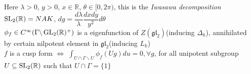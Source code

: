 \documentclass[main]{subfiles}
\begin{document}
Here $\lambda>0$, $y>0$, $x\in\mathbb R$, $\theta\in[0,2\pi)$, this is the \textit{Iwasawa decomposition} $\operatorname{SL}_2(\mathbb R)=NAK$, $dg=\dfrac{d\lambda}{\lambda}\dfrac{dxdy}{y^2}d\theta$ \\
$\phi_f\in C^\infty(\Gamma\backslash\operatorname{GL}_2(\mathbb R)^+)$ is a eigenfunction of $Z(\mathfrak{gl}_2)$(inducing $\Delta_k$), annihilated by certain nilpotent element in $\mathfrak{gl}_2$(inducing $L_k$) \\
$f$ is a cusp form $\iff$ $\displaystyle\int_{U\cap\Gamma\backslash U}\phi_f(Ug)du=0,\forall g$, for all unipotent subgroup $U\subseteq\operatorname{SL}_2(\mathbb R)$ such that $U\cap\Gamma=\{1\}$
\end{document}
